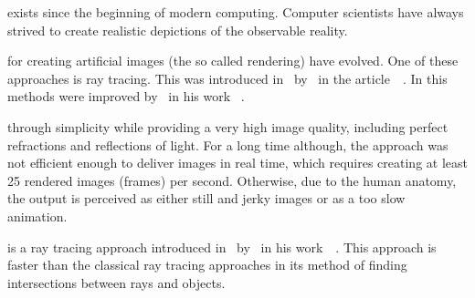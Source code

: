 \documentclass[%
    a4paper,    %
    justified,  %
    nobib,      %
    openany     %
]{tufte-book}
\begin{document}

 exists since the
beginning of modern computing. Computer scientists have always strived to create
realistic depictions of the observable reality.

 for creating artificial images (the so
called rendering) have evolved. One of these approaches is ray tracing. This was
introduced in~\citeyear{appel_techniques_1968}
by~ in the
article~~\cite{appel_techniques_1968}. In
\citeyear{whitted_improved_1980} this methods were improved
by~ in his work
~\cite{whitted_improved_1980}.

 through simplicity while providing a very
high image quality, including perfect refractions and reflections of light. For
a long time although, the approach was not efficient enough to deliver images in
real time, which requires creating at least 25 rendered images (frames) per
second. Otherwise, due to the human anatomy, the output is perceived as either
still and jerky images or as a too slow animation.

 is a ray tracing approach introduced
in~\citeyear{hart_sphere_1994} by~ in his
work~~\cite{hart_sphere_1994}. This approach is
faster than the classical ray tracing approaches in its method of finding
intersections between rays and objects.
\end{document}
